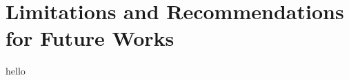 \documentclass[../Main_PhD_Dissertation.tex]{subfiles}
\begin{document}
	
\chapter{Limitations and Recommendations for Future Works }
\label{chap:Limitations}		
	hello
	
\end{document}
